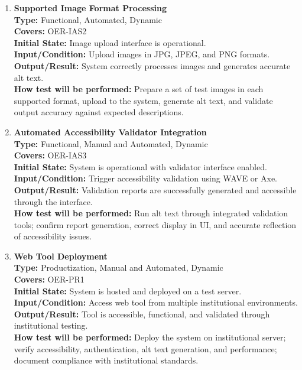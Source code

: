 \documentclass[12pt, titlepage]{article}
\begin{document}
\begin{enumerate}[label=NFR-ST \arabic*., wide=0pt, leftmargin=*]
  \item \textbf{Supported Image Format Processing} \\[2mm]
    \textbf{Type:} Functional, Automated, Dynamic \\
    \textbf{Covers:} OER-IAS2 \\
    \textbf{Initial State:} Image upload interface is operational. \\
    \textbf{Input/Condition:} Upload images in JPG, JPEG, and PNG formats. \\
    \textbf{Output/Result:} System correctly processes images and
    generates accurate alt text. \\[2mm]
    \textbf{How test will be performed:}
    Prepare a set of test images in each supported format, upload to
    the system, generate alt text, and validate output accuracy
    against expected descriptions.

  \item \textbf{Automated Accessibility Validator Integration} \\[2mm]
    \textbf{Type:} Functional, Manual and Automated, Dynamic \\
    \textbf{Covers:} OER-IAS3 \\
    \textbf{Initial State:} System is operational with validator
    interface enabled. \\
    \textbf{Input/Condition:} Trigger accessibility validation using
    WAVE or Axe. \\
    \textbf{Output/Result:} Validation reports are successfully
    generated and accessible through the interface. \\[2mm]
    \textbf{How test will be performed:}
    Run alt text through integrated validation tools; confirm report
    generation, correct display in UI, and accurate reflection of
    accessibility issues.

  \item \textbf{Web Tool Deployment} \\[2mm]
    \textbf{Type:} Productization, Manual and Automated, Dynamic \\
    \textbf{Covers:} OER-PR1 \\
    \textbf{Initial State:} System is hosted and deployed on a test server. \\
    \textbf{Input/Condition:} Access web tool from multiple
    institutional environments. \\
    \textbf{Output/Result:} Tool is accessible, functional, and
    validated through institutional testing. \\[2mm]
    \textbf{How test will be performed:}
    Deploy the system on institutional server; verify accessibility,
    authentication, alt text generation, and performance; document
    compliance with institutional standards.


\end{enumerate}
\end{document}
